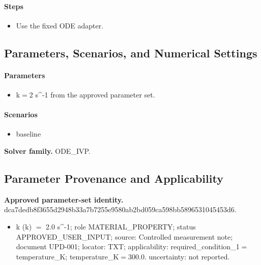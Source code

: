 \documentclass[11pt]{article}
\begin{document}
\paragraph{Steps}
\begin{itemize}\raggedright
\item Use the fixed ODE adapter.
\end{itemize}

\subsection{Parameters, Scenarios, and Numerical Settings}

\paragraph{Parameters}
\begin{itemize}\raggedright
\item k\ensuremath{=}2 s\textasciicircum{}-1 from the approved parameter set.
\end{itemize}

\paragraph{Scenarios}
\begin{itemize}\raggedright
\item baseline
\end{itemize}

\noindent\textbf{Solver family.} ODE\_IVP.

\subsection{Parameter Provenance and Applicability}

\noindent\textbf{Approved parameter-set identity.} dca7dedb8f3655d2\allowbreak{}948b33a7b7255e95\allowbreak{}80ab2bd059ca598b\allowbreak{}b5896531045453d6.
\begin{itemize}\raggedright
\item k (k) \ensuremath{=} 2.0 s\textasciicircum{}-1; role MATERIAL\_\allowbreak{}PROPERTY; status APPROVED\_\allowbreak{}USER\_\allowbreak{}INPUT; source: Controlled measurement note; document UPD-001; locator: TXT; applicability: required\_\allowbreak{}condition\_\allowbreak{}1\ensuremath{=}temperature\_\allowbreak{}K; temperature\_\allowbreak{}K\ensuremath{=}300.0. uncertainty: not reported.
\end{itemize}
\end{document}
